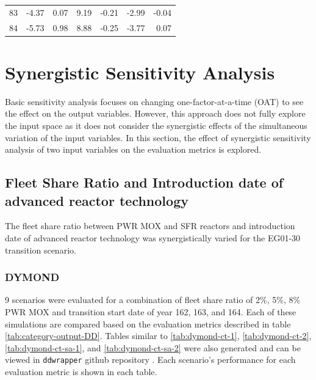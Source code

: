\begin{table}[H]
\begin{tabularx}{\textwidth}{R|RRRRRR}
            83  & -4.37            & 0.07                           & 9.19          & -0.21                       & -2.99             & -0.04                           \\
            84 & -5.73            & 0.98                           & 8.88          & -0.25                       & -3.77             & 0.07                           \\ \hline
           \end{tabularx}%
        \end{table}

\section{Synergistic Sensitivity Analysis}
\label{sec:synergistic}
Basic sensitivity analysis focuses on changing one-factor-at-a-time 
(OAT) to see the effect on the output variables. 
However, this approach does not fully explore the input space as
it does not consider the synergistic effects of the simultaneous 
variation of the input variables.
In this section, the effect of synergistic sensitivity 
analysis of two input variables on the evaluation metrics is explored. 

\subsection{Fleet Share Ratio and Introduction date of advanced 
reactor technology}
The fleet share ratio between PWR MOX and SFR 
reactors and introduction date of advanced reactor 
technology was synergistically varied for 
the EG01-30 transition scenario. 

\subsubsection{\textbf{DYMOND}}
9 scenarios were evaluated for a combination of fleet share ratio 
of 2\%, 5\%, 8\% PWR MOX and transition start date of year 162, 163, 
and 164.
Each of these simulations are compared based on the evaluation
metrics described in table \ref{tab:category-output-DD}.
Tables similar to \ref{tab:dymond-ct-1}, \ref{tab:dymond-ct-2}, 
\ref{tab:dymond-ct-sa-1}, and \ref{tab:dymond-ct-sa-2} were also generated
and can be viewed in \texttt{ddwrapper} github repository 
\cite{chee_gwenchee/ddwrapper_2019}. 
Each scenario's performance for each evaluation metric is shown in each table. 

